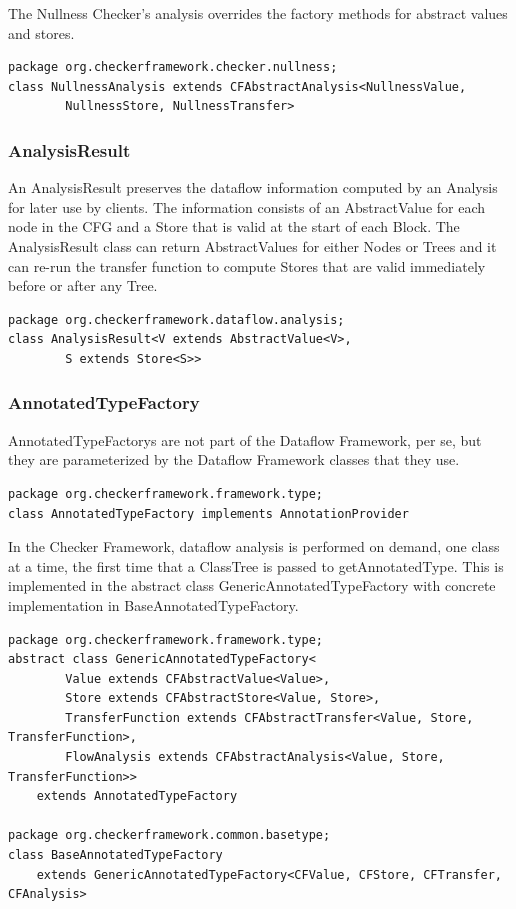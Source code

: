 The Nullness Checker's analysis overrides the factory methods for
abstract values and stores.

\begin{verbatim}
package org.checkerframework.checker.nullness;
class NullnessAnalysis extends CFAbstractAnalysis<NullnessValue,
        NullnessStore, NullnessTransfer>
\end{verbatim}


\subsubsection{AnalysisResult}
\label{sec:analysis_result_class}

An AnalysisResult preserves the dataflow information computed by an
Analysis for later use by clients.  The information consists of an
AbstractValue for each node in the CFG and a Store that is valid at
the start of each Block.  The AnalysisResult class can return
AbstractValues for either Nodes or Trees and it can re-run the
transfer function to compute Stores that are valid immediately before
or after any Tree.

\begin{verbatim}
package org.checkerframework.dataflow.analysis;
class AnalysisResult<V extends AbstractValue<V>,
        S extends Store<S>>
\end{verbatim}


\subsubsection{AnnotatedTypeFactory}
\label{sec:annotated_type_factory_classes}

AnnotatedTypeFactorys are not part of the Dataflow Framework, per se,
but they are parameterized by the Dataflow Framework classes that they
use.

\begin{verbatim}
package org.checkerframework.framework.type;
class AnnotatedTypeFactory implements AnnotationProvider
\end{verbatim}

In the Checker Framework, dataflow analysis is performed on demand,
one class at a time, the first time that a ClassTree is passed to
getAnnotatedType.  This is implemented in the abstract class
GenericAnnotatedTypeFactory with concrete implementation in
BaseAnnotatedTypeFactory.

\begin{verbatim}
package org.checkerframework.framework.type;
abstract class GenericAnnotatedTypeFactory<
        Value extends CFAbstractValue<Value>,
        Store extends CFAbstractStore<Value, Store>,
        TransferFunction extends CFAbstractTransfer<Value, Store, TransferFunction>,
        FlowAnalysis extends CFAbstractAnalysis<Value, Store, TransferFunction>>
    extends AnnotatedTypeFactory

package org.checkerframework.common.basetype;
class BaseAnnotatedTypeFactory
    extends GenericAnnotatedTypeFactory<CFValue, CFStore, CFTransfer, CFAnalysis>
\end{verbatim}


